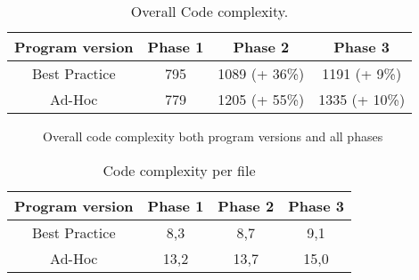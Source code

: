 \begin{table}[htbp]
	\centering
	\begin{tabular}{|c|c|c|c|} \hline
		\textbf{Program version} &\textbf{Phase 1} & \textbf{Phase 2} & \textbf{Phase 3} \\ \hline
		Best Practice & 795 & 1089 (+ 36\%)& 1191 (+ 9\%)\\ \hline
		Ad-Hoc & 779 & 1205 (+ 55\%)& 1335 (+ 10\%)\\ \hline
	\end{tabular}
	\caption{Overall Code complexity.}
	\label{table:total-complexity}
\end{table}

\begin{figure}[htbp]
	
	\centering
	\caption{Overall code complexity both program versions and all phases}
	\label{fig:total-complexity}
\end{figure}

\begin{table}[htbp]
		\centering
	\begin{tabular}{|c|c|c|c|} \hline
		\textbf{Program version} &\textbf{Phase 1} & \textbf{Phase 2} & \textbf{Phase 3} \\ \hline
		Best Practice & 8,3 & 8,7 & 9,1 \\ \hline
		Ad-Hoc & 13,2 & 13,7 & 15,0 \\ \hline
	\end{tabular}
	\caption{Code complexity per file}
	\label{table:file-complexity}
\end{table}
